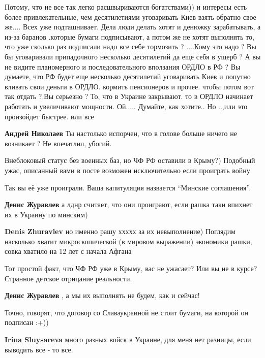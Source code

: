 \begin{itemize}
\begin{itemize}
Потому, что не все так легко расшвыриваются богатствами)) и интересы есть более
привлекательные, чем десятилетиями уговаривать Киев взять обратно свое же....
Всех уже подташнивает. Дела люди делать хотят и денюжку зарабатывать, а из-за
баранов .которые бумаги подписывают, а потом же не хотят выполнять то, что уже
сколько раз подписали надо все себе тормозить ? ....Кому это надо ? Вы бы
уговаривали припадочного несколько десятилетий да еще себя в ущерб ? А вы не
видите планомерного и последовательного вползания ОРДЛО в РФ ? Вы думаете, что
РФ будет еще несколько десятилетий уговаривать Киев и попутно вливать свои
деньги в ОРДЛО. кормить пенсионеров и прочее. чтобы потом вот так отдать ?.Вы
серьезно ? То, что в Украине закрывают. то в ОРДЛО начинает работать и
увеличивают мощности. Ой..... Думайте, как хотите.. Но ..,или это произойдет
быстрее. или все


\textbf{Андрей Николаев} Ты настолько испорчен, что в голове больше ничего не возникает ? Не впечатлил, убогий.
\end{itemize} %


Внеблоковый статус без военных баз, но ЧФ РФ оставили в Крыму?) Подобный ужас,
описанный вами в посте возможен исключительно если проиграть войну

\begin{itemize} %
Так вы её уже проиграли. Ваша капитуляция назвается \enquote{Минские соглашения}.

\textbf{Денис Журавлев} а лднр считает, что они проиграют, если рашка таки впихнет их в Украину по минским)


\textbf{Denis Zhuravlev} но именно рашу ххххх за их невыполнение)
Поглядим насколько хватит микроскопической (в мировом выражении) экономики рашки, совка хватило на 12 лет с начала Афгана

Тот простой факт, что ЧФ РФ уже в Крыму, вас не ужасает? Или вы не в курсе? Странное детское отрицание реальности.

\textbf{Денис Журавлев} , а мы их выполнять не будем, как и сейчас!

Точно, говорят, что договор со Славаукраиной не стоит бумаги, на которой он подписан :+))


\textbf{Irina Sluysareva} много разных войск в Украине, для меня нет разницы, если выводить все - то все.


\end{itemize}
\end{itemize}
